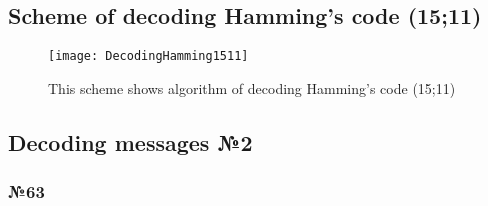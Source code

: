 \documentclass[12pt]{article}
\begin{document}
	\subsection{\Large Scheme of decoding Hamming's code (15;11)}
	\begin{figure}[h!]
		\centering
		\texttt{[image: DecodingHamming1511]}
		\caption{This scheme shows algorithm of decoding Hamming's code (15;11)}
		\label{fig:decoding1511}
	\end{figure}
	\subsection{\Large Decoding messages №2}
	\subsubsection{\Large №63}
\end{document}

